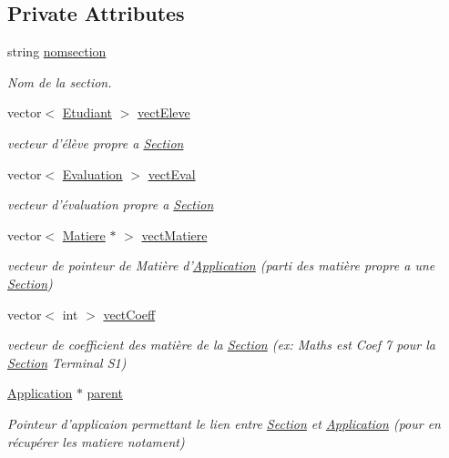 \subsection*{Private Attributes}
\begin{DoxyCompactItemize}
\item 
string \hyperlink{class_section_a74c53e192d8055ffe2ef8ca0e814662c}{nomsection}
\begin{DoxyCompactList}\small\item\em Nom de la section. \end{DoxyCompactList}\item 
vector$<$ \hyperlink{class_etudiant}{Etudiant} $>$ \hyperlink{class_section_a53c0f63296e6c0a58208f3f13b6eb1a0}{vect\+Eleve}
\begin{DoxyCompactList}\small\item\em vecteur d'élève propre a \hyperlink{class_section}{Section} \end{DoxyCompactList}\item 
vector$<$ \hyperlink{class_evaluation}{Evaluation} $>$ \hyperlink{class_section_ad1006e87bbe4c2ac441c12504cc16fa4}{vect\+Eval}
\begin{DoxyCompactList}\small\item\em vecteur d'évaluation propre a \hyperlink{class_section}{Section} \end{DoxyCompactList}\item 
vector$<$ \hyperlink{class_matiere}{Matiere} $\ast$ $>$ \hyperlink{class_section_ab4d854da53a93ae314bef4f849ab7649}{vect\+Matiere}
\begin{DoxyCompactList}\small\item\em vecteur de pointeur de Matière d'\hyperlink{class_application}{Application} (parti des matière propre a une \hyperlink{class_section}{Section}) \end{DoxyCompactList}\item 
vector$<$ int $>$ \hyperlink{class_section_a804c0479bba4cb92a12823c10e1e6944}{vect\+Coeff}
\begin{DoxyCompactList}\small\item\em vecteur de coefficient des matière de la \hyperlink{class_section}{Section} (ex\+: Maths est Coef 7 pour la \hyperlink{class_section}{Section} Terminal S1) \end{DoxyCompactList}\item 
\hyperlink{class_application}{Application} $\ast$ \hyperlink{class_section_af3bb36866f8d63e6059ba7b54247eb7c}{parent}
\begin{DoxyCompactList}\small\item\em Pointeur d'applicaion permettant le lien entre \hyperlink{class_section}{Section} et \hyperlink{class_application}{Application} (pour en récupérer les matiere notament) \end{DoxyCompactList}\end{DoxyCompactItemize}


